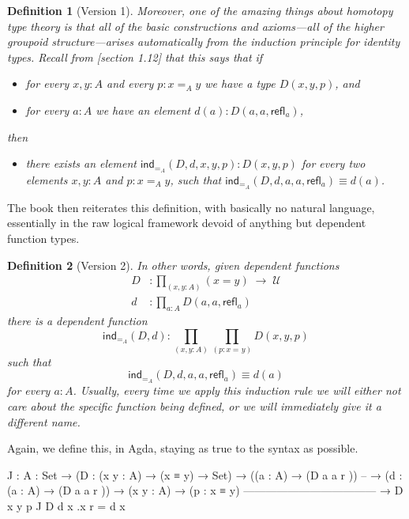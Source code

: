 \documentclass[11pt, a4paper]{article}
\newtheorem{definition}{Definition}
\newcommand{\jdeq}{\equiv}      %
\newcommand{\refl}[1]{\ensuremath{\mathsf{refl}_{#1}}\xspace}
\newcommand{\ind}[1]{\mathsf{ind}_{#1}}
\newcommand{\indid}[1]{\ind{=_{#1}}} %
\newcommand{\id}[3][]{\ensuremath{#2 =_{#1} #3}\xspace}
\newcommand{\UU}{\ensuremath{\mathcal{U}}\xspace}
\let\type\UU
\begin{document}
\begin{definition}[Version 1]

Moreover, one of the amazing things about homotopy type theory is that all of the basic constructions and axioms---all of the
higher groupoid structure---arises automatically from the induction
principle for identity types.
Recall from [section 1.12]  that this says that if %
  \begin{itemize}[noitemsep]
    \item for every $x,y:A$ and every $p:\id[A]xy$ we have a type $D(x,y,p)$, and
    \item for every $a:A$ we have an element $d(a):D(a,a,\refl a)$,
  \end{itemize}
then
  \begin{itemize}[noitemsep]
    \item there exists an element $\indid{A}(D,d,x,y,p):D(x,y,p)$ for \emph{every}
    two elements $x,y:A$ and $p:\id[A]xy$, such that $\indid{A}(D,d,a,a,\refl a)
    \jdeq d(a)$.
  \end{itemize}
\end{definition}
The book then reiterates this definition, with basically no natural language,
essentially in the raw logical framework devoid of anything but dependent
function types.
\begin{definition}[Version 2]
In other words, given dependent functions
\begin{align*}
  D & :\prod_{(x,y:A)}(x= y) \; \to \; \type\\
  d & :\prod_{a:A} D(a,a,\refl{a})
\end{align*}
there is a dependent function
\[\indid{A}(D,d):\prod_{(x,y:A)}\prod_{(p:\id{x}{y})} D(x,y,p)\]
such that
\begin{equation}\label{eq:Jconv}
\indid{A}(D,d,a,a,\refl{a})\jdeq d(a)
\end{equation}
for every $a:A$.
Usually, every time we apply this induction rule we will either not care about the specific function being defined, or we will immediately give it a different name.

\end{definition}
Again, we define this, in Agda, staying as true to the syntax as possible.
\begin{code}

  J : {A : Set}
      → (D : (x y : A) → (x ≡ y) →  Set)
      → ((a : A) → (D a a r )) -- → (d : (a : A) → (D a a r ))
      → (x y : A)
      → (p : x ≡ y)
      ------------------------------------
      → D x y p
  J D d x .x r = d x

\end{code}
\end{document}
